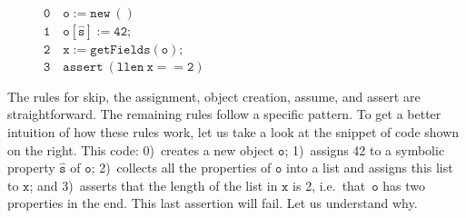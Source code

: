 \begin{figure}
\vspace*{-0.7cm}
{\small
\hspace*{0.25cm} $\mathtt{0\quad o := new\ ()}$ \\
\hspace*{0.25cm} $\mathtt{1\quad o[\hat{s}] := 42};$ \\
\hspace*{0.25cm} $\mathtt{2\quad x := getFields(o);}$ \\
\hspace*{0.25cm} $\mathtt{3\quad assert\ (llen \ x == 2)}$
}
\vspace*{-0.5cm}
\end{figure}
The rules for skip, the assignment, object creation, assume, and assert are straightforward. The remaining rules follow a specific pattern. To get a better intuition of how these rules work, let us take a look at the snippet of code shown on the right. 
This code: 
	0)~creates a new object $\mathtt{o}$;
	1)~assigns 42 to a symbolic property $\mathtt{\hat{s}}$ of $\mathtt{o}$; 
	2)~collects all the properties of $\mathtt{o}$ into a list and assigns this list to $\mathtt{x}$; and
	3)~asserts that the length of the list in $\mathtt{x}$ is 2, i.e.~that~$\mathtt{o}$ has two properties in the end. This last assertion will fail. Let us understand why.

